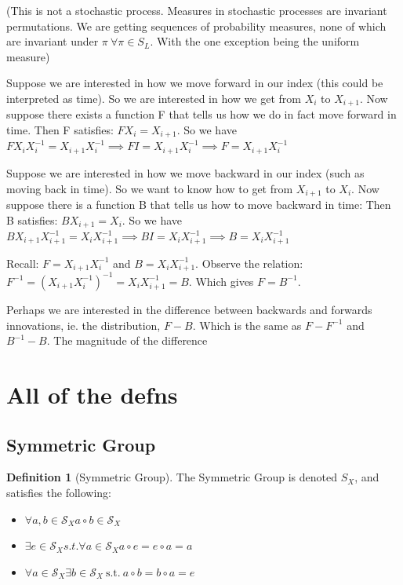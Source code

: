 \documentclass{article}
\theoremstyle{definition}
\newtheorem{definition}{Definition}
\begin{document}
(This is not a stochastic process. Measures in stochastic processes are invariant permutations. We are getting sequences of probability measures, none of which are invariant under $\pi \: \forall \pi \in S_L$. With the one exception being the uniform measure)

Suppose we are interested in how we move forward in our index (this could be interpreted as time). So we are interested in how we get from $X_i$ to $X_{i+1}$. Now suppose there exists a function F that tells us how we do in fact move forward in time.
Then F satisfies: $F X_i = X_{i+1} $. So we have $FX_i X_i^{-1} = X_{i+1}X_i^{-1} \implies FI = X_{i+1}X_i^{-1} \implies F = X_{i+1}X_i^{-1} $ 

Suppose we are interested in how we move backward in our index (such as moving back in time). So we want to know how to get from $X_{i+1}$ to $X_i$. Now suppose there is a function B that tells us how to move backward in time:
Then B satisfies: $BX_{i+1}= X_i$. So we have $BX_{i+1}X_{i+1}^{-1} = X_i X_{i+1}^{-1} \implies B I = X_i X_{i+1}^{-1} \implies  B = X_i X_{i+1}^{-1} $

Recall: $ F = X_{i+1}X_{i}^{-1}$ and $B = X_{i}X_{i+1}^{-1}$. Observe the relation: $F^{-1} = (X_{i+1}X_{i}^{-1})^{-1} = X_{i}X_{i+1}^{-1} = B$. Which gives $F = B^{-1}$.

Perhaps we are interested in the difference between backwards and forwards innovations, ie. the distribution, $F - B$. Which is the same as $F - F^{-1}$ and $B^{-1} - B$. The magnitude of the difference 

\section{All of the defns}
\subsection{Symmetric Group}
\begin{definition}[Symmetric Group] The Symmetric Group is denoted $S_X$, and satisfies the following:
\begin{itemize}
\item \( \forall a,b \in \mathcal{S}_X  a \circ b \in \mathcal{S}_X \)
\item \( \exists e \in \mathcal{S}_X s.t. \forall a \in \mathcal{S}_X a \circ e = e \circ a = a\)
\item \( \forall a \in \mathcal{S}_X \exists b \in \mathcal{S}_X \: \text{s.t.} \: a \circ b = b \circ a = e\)
\end{itemize}
\end{definition}
\end{document}
